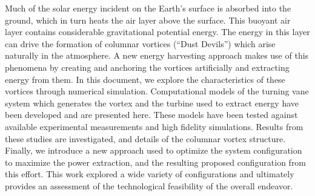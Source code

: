 \doublespacing

%

 Much of the solar energy incident on the Earth's surface is absorbed
 into the ground, which in turn heats the air layer above the surface.
 This buoyant air layer contains considerable gravitational potential
 energy. The energy in this layer can drive the formation of columnar
 vortices (``Dust Devils'') which arise naturally in the atmosphere. A
 new energy harvesting approach 
 makes use of this phenomena by creating and anchoring the vortices
 artificially and extracting energy from them. In this document, 
 we explore the characteristics of these vortices
 through numerical simulation. Computational models of the turning vane 
 system which generates the vortex and the turbine used to extract
 energy have been developed and are presented here. These models have 
 been tested against available experimental measurements and high
 fidelity simulations. Results from these studies are investigated, and
 details of the columnar vortex structure. Finally, we introduce a new
 approach used to optimize the system configuration to maximize the
 power extraction, and the resulting proposed configuration
 from this effort. This work explored a wide variety of configurations
 and ultimately provides an assessment of the technological feasibility
 of the overall endeavor.     

%
%
%


